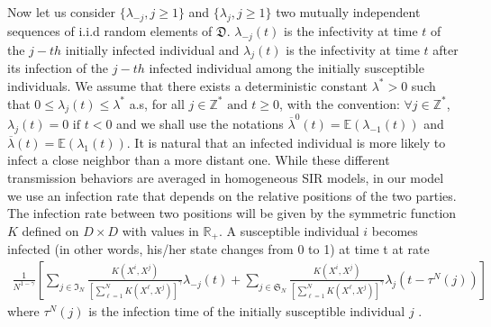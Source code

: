 \documentclass[notitlepage,reqno,11pt]{amsart}
\numberwithin{equation}{section}
\def\R{\mathbb{R}}
\begin{document}
Now let us consider $\{\lambda_{-j} , j\geq 1\}$ and $\{\lambda_{j} , j\geq 1\}$ two mutually independent sequences of  i.i.d random elements  of $\mathfrak{D}.$ $\lambda_{-j}(t)$ is the infectivity at time $t$ of the $j-th$  initially infected individual and $\lambda_{j}(t)$ is the infectivity at time $t$ after its infection of the $j-th$ infected individual among the initially susceptible individuals. We assume that there exists a deterministic constant $\lambda^*>0$ such that $0\leq\lambda_{j}(t)\leq \lambda^*$ a.s, for all $j\in \mathbb{Z}^* \text{ and } t\geq 0$, with the convention: $\forall j \in \mathbb{Z}^*$, $\lambda_{j}(t) = 0 \text{ if } t < 0$ and we shall use the notations $\overline{\lambda}^0(t)= \mathbb{E}(\lambda_{-1}(t))$ and $\overline{\lambda}(t)= \mathbb{E}(\lambda_{1}(t))$. It is natural that an infected individual is more likely to infect a close neighbor than a more distant one. While these different transmission behaviors are averaged in homogeneous SIR models, in our model we use an infection rate that depends on the relative positions of the two parties. The infection rate between two positions will be given by the  symmetric function $K$ defined on $D \times D$ with values in $ \R_+$. A susceptible individual $i$ becomes infected (in other words, his/her state changes from 0 to 1) at time t at rate
\begin{equation}
\label{par1eq1}
\begin{aligned}
\frac{1}{N^{1-\gamma}} \left[\displaystyle  \sum_{j\in\mathfrak{I}_N} \frac{K(X^{i},X^{j})}{\left[\displaystyle \sum_{\ell=1}^N K(X^{\ell},X^{j})\right]^{\gamma}} \lambda_{-j}(t)+ \sum_{j\in\mathfrak{S}_N} \frac{K(X^{i},X^{j})}{\left[\displaystyle \sum_{\ell=1}^N K(X^{\ell},X^{j})\right]^{\gamma}} \lambda_{j}(t- \tau^N(j))\right]
\end{aligned}
\end{equation}
where $\tau^N(j)$ is the infection time of the initially susceptible individual $j$ .\\
\end{document}
